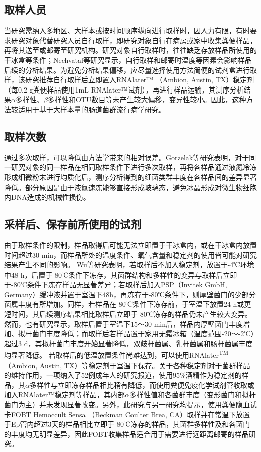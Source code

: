 \subsection{取样人员}
当研究需纳入多地区、大样本或按时间顺序纵向进行取样时，因人力有限，有时要求研究对象代替研究人员自行取样，即研究对象自行在病房或家中收集粪便样品，再将其送至或邮寄至研究机构\cite{kumar2014getting}。研究对象自行取样时，往往缺乏存放样品所使用的干冰盒等条件；Nechvatal等\cite{nechvatal2008fecal}研究显示，自行取样和邮寄时温度等因素会影响样品后续的分析结果。为避免分析结果偏移，应尽量选择使用方法简便的试剂盒进行取样，该研究推荐自行取样后立即置入RNAlater™ （Ambion, Austin, TX）稳定剂（每0.2 g粪便样品使用1mL RNAlater™试剂），再进行样品运输，其测序分析结果$\alpha$多样性、$\beta$多样性和OTU数目等未产生较大偏移，变异性较小。因此，这种方法较适用于基于大样本量的肠道菌群流行病学研究。
\subsection{取样次数}
通过多次取样，可以降低由方法学带来的相对误差。Gorzelak等\cite{gorzelak2015methods}研究表明，对于同一研究对象的同一样品在相同取样条件下进行多次取样，再将各样品通过液氮冷冻形成细微粉末进行均质化后，测序分析得到的细菌类群丰度在各样品间的差异显著降低。部分原因是由于液氮速冻能够直接形成玻璃态，避免冰晶形成对微生物细胞内DNA造成的机械性损伤\cite{iancu2006comparison}。
\subsection{采样后、保存前所使用的试剂}
由于取样条件的限制，样品取得后可能无法立即置于干冰盒内，或在干冰盒内放置时间超过30 min，而样品所处的温度条件、氧气含量和稳定剂的使用皆可能对研究结果产生不同的影响\cite{nechvatal2008fecal,iancu2006comparison}。
Wu等\cite{wu2010sampling}研究表明，若取样后不加入稳定剂，放置于-4℃环境中48 h，后置于-80℃条件下冻存，其菌群结构和多样性的变异与取样后立即于-80℃条件下冻存样品无显著差异；若取样后加入PSP\textsuperscript{\textregistered}（Invitek GmbH, Germany）缓冲液并置于室温下48h，再冻存于-80℃条件下，则厚壁菌门的少部分菌属丰度有所增加。同样，若样品在-80℃条件下冻存前，于室温下放置24 h或更短时间，其后续测序结果相比取样后立即于-80℃冻存的样品仍未产生较大变异\cite{tedjo2015effect}。然而，也有研究显示，取样后置于室温下15～30 min后，样品内厚壁菌门丰度增加、拟杆菌门丰度降低；而取样后若样品置于家用无霜冰箱（温度范围-20～-2℃）超过3 d，其拟杆菌门丰度开始显著降低，双歧杆菌属、乳杆菌属和肠杆菌属丰度均显著降低\cite{gorzelak2015methods}。
若取样后的低温放置条件尚难达到，可以使用RNAlater\textsuperscript{TM}（Ambion, Austin, TX）等稳定剂于室温下保存。关于各种稳定剂对于菌群样品的维持作用，一项纳入了52例成年人的研究报道，使用95\%酒精作为稳定剂的样品，其$\alpha$多样性与立即冻存样品相比稍有降低，而使用粪便免疫化学试剂管收取或加入RNAlater™稳定剂等样品，其内部$\alpha$多样性值和各菌群丰度（变形菌门和拟杆菌门为主）并未发现显著改变\cite{vogtmann2017comparison}。另外，此研究与另一研究均提示，使用粪便隐血试卡FOBT Hemoccult Sensa\textsuperscript{\textregistered} （Beckman Coulter Brea, CA）取样并在常温下放置于Ep管内超过3天的样品相比立即于-80℃冻存的样品，其菌群多样性及和各菌门的丰度均无明显差异，因此FOBT收集样品适合用于需要进行远距离邮寄的样品研究\cite{vogtmann2017comparison,dominianni2014comparison}。
